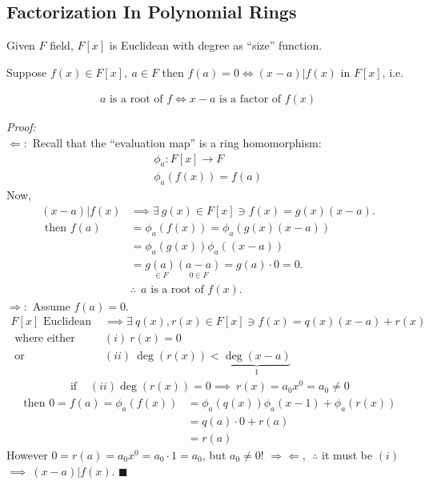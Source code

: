 \subsection*{Factorization In Polynomial Rings}
Given $F$ field, $F[x]$ is Euclidean with degree as ``size'' function.
\begin{lemma*}
    Suppose $f(x)\in F[x], \ a\in F$ then $f(a)=0 \iff (x-a)|f(x)$ in $F[x]$, i.e.
    \begin{center}
        \begin{align*}
            \boxed{ a \text{ is a root of }f \iff x-a \text{ is a factor of }f(x)}
        \end{align*}
    \end{center}
    \noindent \textit{Proof:} \\
    
    \noindent $\Leftarrow:$ Recall that the ``evaluation map'' is a ring homomorphism:
    \begin{align*}
        \phi_a: F[x]\rightarrow F \\
        \phi_a(f(x))=f(a)
    \end{align*}
    Now,
    \begin{align*}
        (x-a)|f(x) &\implies \exists \ g(x) \in F[x]\ni f(x)=g(x)(x-a). \\
        \text{ then }f(a) &= \phi_a(f(x))=\phi_a(g(x)(x-a)) \\
        &= \phi_a(g(x))\phi_a((x-a)) \\
        &= \underset{\in F}{g(a)}\underset{0\in F}{(a-a)} = g(a)\cdot 0 = 0. \\
        &\therefore \ \ a \text{ is a root of }f(x).
    \end{align*}
    \noindent $\Rightarrow :$ Assume $f(a)=0$. \\
    \begin{align*}
        F[x] \text{ Euclidean } &\implies \exists \ q(x), r(x) \in F[x] \ni f(x)=q(x)(x-a)+r(x) \\
        \text{ where either } &(i) \ r(x)=0  \\
        \text{ or } &(ii) \ \deg(r(x))< \underbrace{\deg(x-a)}_{1} 
    \end{align*}
    \begin{align*}
        \text{ if }&(ii) \deg(r(x))=0 \implies \ r(x)=a_0x^0 = a_0 \neq 0 
    \end{align*}
    \begin{align*}
        \text{ then } 0 = f(a) = \phi_a(f(x)) &= \phi_a(q(x))\phi_a(x-1)+\phi_a(r(x)) \\
        &= q(a)\cdot 0 + r(a) \\
        &= r(a)
    \end{align*}
    However $0=r(a)=a_0x^0 = a_0\cdot 1 = a_0$, but $a_0 \neq 0$! $\Rightarrow \Leftarrow, \ \ \therefore$ it must be $(i)$ \\
    $\implies \ (x-a)|f(x)$. $\blacksquare$
\end{lemma*}

